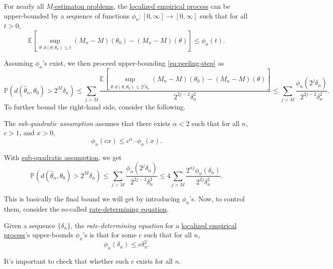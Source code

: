 \begin{note}
	For nearly all \hyperref[prb:M-estimation]{\(M\)-estimaton problems}, the \hyperref[def:localized-EP]{localized empirical process} can be upper-bounded by a sequence of functions \(\phi _n\colon [0, \infty ] \to [0, \infty ]\) such that for all \(t > 0\),
	\[
		\mathbb{E}_{}\left[\sup _{\theta \colon d(\theta , \theta _0) \leq t} (M_n - M)(\theta _0) - (M_n - M)(\theta ) \right] \leq \phi _n(t).
	\]
\end{note}

Assuming \(\phi _n\)'s exist, we then proceed upper-bounding \autoref{eq:peeling-step} as
\[
	\mathbb{P} (d(\hat{\theta} _n, \theta _0) > 2^M \delta _n)
	\leq \sum_{j > M} \frac{\mathbb{E}_{}\left[\sup _{\theta \colon d(\theta , \theta _0) \leq 2^j \delta _n} (M_n - M)(\theta _0) - (M_n - M)(\theta ) \right] }{2^{2j - 2} \delta _n^2 }
	\leq \sum_{j > M} \frac{\phi _n(2^j \delta _n)}{2^{2j - 2} \delta _n^2}.
\]
To further bound the right-hand side, consider the following.

\begin{definition}\label{def:sub-quadratic-assumption}
	The \emph{sub-quadratic assumption} assumes that there exists \(\alpha < 2\) such that for all \(n\), \(c > 1\), and \(x > 0\),
	\[
		\phi _n(cx) \leq c^\alpha \cdot \phi _n(x).
	\]
\end{definition}

With \hyperref[def:sub-quadratic-assumption]{sub-quadratic assumption}, we get
\[
	\mathbb{P} (d(\hat{\theta} _n, \theta _0) > 2^M \delta _n)
	\leq \sum_{j > M} \frac{\phi _n(2^j \delta _n)}{2^{2j - 2} \delta _n^2}
	\leq 4 \sum_{j > M} \frac{2^{\alpha j} \phi _n(\delta _n)}{2^{2j} \delta _n^2}.
\]

This is basically the final bound we will get by introducing \(\phi _n\)'s. Now, to control them, consider the so-called \hyperref[def:rate-determining-equation]{rate-determining equation}.

\begin{definition}\label{def:rate-determining-equation}
	Given a sequence \(\{ \delta _n \} \), the \emph{rate-determining equation} for a \hyperref[def:localized-EP]{localized empirical process}'s upper-bounds \(\phi _n\)'s is that for some \(c\) such that for all \(n\),
	\[
		\phi _n(\delta _n) \leq c \delta _n^2.
	\]
\end{definition}

\begin{remark}
	It's important to check that whether such \(c\) exists for all \(n\).
\end{remark}

